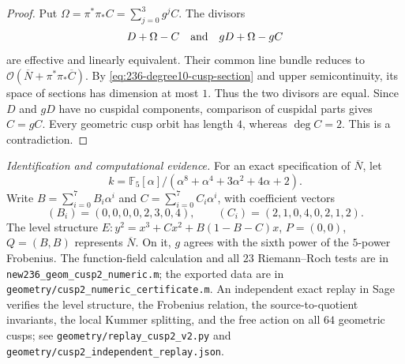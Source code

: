 \begin{proof}
Put $\Omega=\pi^*\pi_*C=\sum_{j=0}^3g^jC$.
The divisors
\[
 D+\Omega-C\quad\hbox{and}\quad gD+\Omega-gC
\]
are effective and linearly equivalent.
Their common line bundle reduces to
$\mathcal O(\overline N+\pi^*\pi_*\overline C)$.
By \eqref{eq:236-degree10-cusp-section} and upper semicontinuity,
its space of sections has dimension at most $1$.
Thus the two divisors are equal.
Since $D$ and $gD$ have no cuspidal components, comparison of
cuspidal parts gives $C=gC$.
Every geometric cusp orbit has length $4$, whereas $\deg C=2$.
This is a contradiction.
\end{proof}

\noindent\emph{Identification and computational evidence.}
For an exact specification of $\overline N$, let
\[
 k=\mathbb F_5[\alpha]/
 (\alpha^8+\alpha^4+3\alpha^2+4\alpha+2).
\]
Write $B=\sum_{i=0}^7B_i\alpha^i$ and
$C=\sum_{i=0}^7C_i\alpha^i$, with coefficient vectors
\[
 (B_i)=(0,0,0,0,2,3,0,4),\qquad
 (C_i)=(2,1,0,4,0,2,1,2).
\]
The level structure
$E:y^2=x^3+Cx^2+B(1-B-C)x$, $P=(0,0)$, $Q=(B,B)$
represents $\overline N$. On it, $g$ agrees with the sixth
power of the $5$-power Frobenius.
The function-field calculation and all $23$ Riemann--Roch tests
are in \texttt{new236\_geom\_cusp2\_numeric.m}; the exported data
are in \texttt{geometry/cusp2\_numeric\_certificate.m}.
An independent exact replay in Sage verifies the level structure,
the Frobenius relation, the source-to-quotient invariants, the
local Kummer splitting, and the free action on all $64$ geometric
cusps; see \texttt{geometry/replay\_cusp2\_v2.py} and
\texttt{geometry/cusp2\_independent\_replay.json}.
